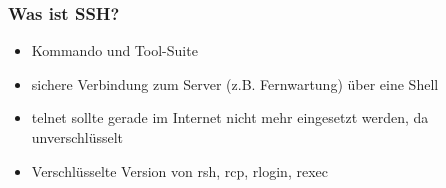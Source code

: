 \begin{frame}
\frametitle{Was ist SSH?}
\begin{itemize}
\item Kommando und Tool-Suite 
\pause
\item sichere Verbindung zum Server (z.B. Fernwartung) über eine Shell
\pause 
\item telnet sollte gerade im Internet nicht mehr eingesetzt werden, da unverschlüsselt
\pause
\item Verschlüsselte Version von rsh, rcp, rlogin, rexec
\end{itemize}
\end{frame}